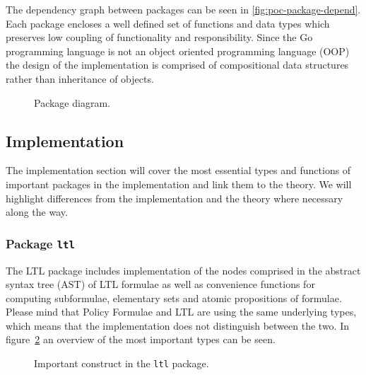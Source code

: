 The dependency graph between packages can be seen in \autoref{fig:poc-package-depend}. Each package encloses a well defined set of functions and data types which preserves low coupling of functionality and responsibility. Since the Go programming language is not an object oriented programming language (OOP) the design of the implementation is comprised of compositional data structures rather than inheritance of objects.

\begin{figure}[!ht]
    \centering
    
    \caption{Package diagram.}
    \label{fig:poc-package-depend}
\end{figure}

\subsection{Implementation}
The implementation section will cover the most essential types and functions of important packages in the implementation and link them to the theory. We will highlight differences from the implementation and the theory where necessary along the way.

\subsubsection{Package \texttt{ltl}}
The LTL package includes implementation of the nodes comprised in the abstract syntax tree (AST) of LTL formulae as well as convenience functions for computing subformulae, elementary sets and atomic propositions of formulae. Please mind that Policy Formulae and LTL are using the same underlying types, which means that the implementation does not distinguish between the two. In figure~\ref{fig:poc-ltl-package} an overview of the most important types can be seen.
\begin{figure}
    \caption{Important construct in the \texttt{ltl} package.}
    \label{fig:poc-ltl-package}
\end{figure}

